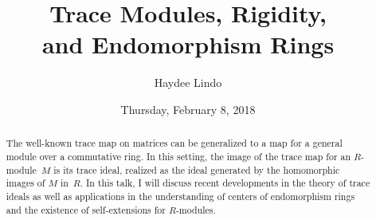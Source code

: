 \documentclass{UAmathtalk}
\author{Haydee Lindo}
\title{Trace Modules, Rigidity,\\ and Endomorphism Rings}
\date{Thursday, February 8, 2018}
\begin{document}
\maketitle

\begin{abstract}
The well-known trace map on matrices can be generalized to a map for a general module over a commutative ring. In this setting, the image of the trace map for an $R$-module~$M$ is its trace ideal, realized as the ideal generated by the homomorphic images of $M$ in~$R$. In this talk, I will discuss recent developments in the theory of trace ideals as well as applications in the understanding of centers of endomorphism rings and the existence of self-extensions for $R$-modules.
\end{abstract}
\end{document}
